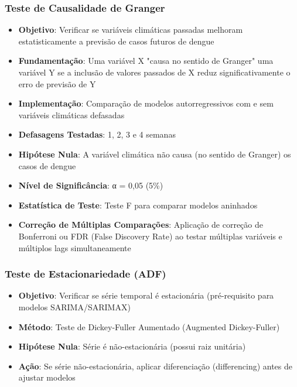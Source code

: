 \subsubsection{Teste de Causalidade de Granger}

\begin{itemize}
    \item \textbf{Objetivo}: Verificar se variáveis climáticas passadas melhoram estatisticamente a previsão de casos futuros de dengue
    \item \textbf{Fundamentação}: Uma variável X "causa no sentido de Granger" uma variável Y se a inclusão de valores passados de X reduz significativamente o erro de previsão de Y
    \item \textbf{Implementação}: Comparação de modelos autorregressivos com e sem variáveis climáticas defasadas
    \item \textbf{Defasagens Testadas}: 1, 2, 3 e 4 semanas
    \item \textbf{Hipótese Nula}: A variável climática não causa (no sentido de Granger) os casos de dengue
    \item \textbf{Nível de Significância}: α = 0,05 (5\%)
    \item \textbf{Estatística de Teste}: Teste F para comparar modelos aninhados
    \item \textbf{Correção de Múltiplas Comparações}: Aplicação de correção de Bonferroni ou FDR (False Discovery Rate) ao testar múltiplas variáveis e múltiplos lags simultaneamente
\end{itemize}

\subsubsection{Teste de Estacionariedade (ADF)}

\begin{itemize}
    \item \textbf{Objetivo}: Verificar se série temporal é estacionária (pré-requisito para modelos SARIMA/SARIMAX)
    \item \textbf{Método}: Teste de Dickey-Fuller Aumentado (Augmented Dickey-Fuller)
    \item \textbf{Hipótese Nula}: Série é não-estacionária (possui raiz unitária)
    \item \textbf{Ação}: Se série não-estacionária, aplicar diferenciação (differencing) antes de ajustar modelos
\end{itemize}

